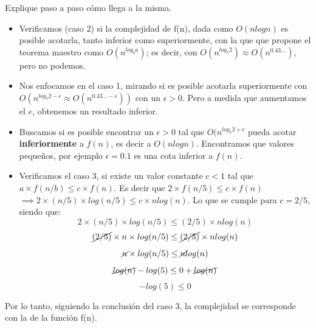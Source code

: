 \documentclass[titlepage,a4paper]{article}
\begin{document}
\begin{tcolorbox}[colback=blue!5!white,colframe=blue!75!black,title=Enunciado 2.3]
    Explique paso a paso cómo llega a la misma.
\end{tcolorbox}
\begin{itemize}
    \item Verificamos (caso 2) si la complejidad de f(n), dada como $O(n log n)$ es posible acotarla, tanto inferior como
    superiormente, con la que que propone el teorema maestro como $O(n^{log_b a})$; es decir, con
    $O(n^{log_5 2}) \approx O(n^{0.43...})$, pero no podemos.
    \item Nos enfocamos en el caso 1, mirando si es posible acotarla superiormente con
    $O(n^{log_5 2 - \epsilon}  \approx O(n^{0.43... - \epsilon}))$
    con un $\epsilon>0$. Pero a medida que aumentamos el $e$, obtenemos un resultado inferior.
    \item Buscamos si es posible encontrar un $\epsilon > 0$ tal que $O(n^{log_5 2 + \epsilon}$ pueda acotar
    \textbf{inferiormente} a $f(n)$, es decir a $O(n log n)$. Encontramos que valores pequeños, por ejemplo
    $\epsilon = 0.1$ es una cota inferior a $f(n)$.
    \item Verificamos el caso 3, si existe un valor constante $c < 1$ tal que $a \times f(n/b) \leq c \times f(n)$.
    Es decir que $2 \times f(n/5) \leq c \times f(n)$
    $\implies 2 \times (n/5)\times log(n/5) \leq c \times n log(n)$.
    Lo que se cumple para $c=2/5$, siendo que:
    $$2 \times (n/5)\times log(n/5) \leq (2/5) \times n log(n)$$
    $$\cancel{(2/5)} \times n \times log(n/5) \leq \cancel{(2/5)} \times n log(n)$$
    $$\cancel{n} \times log(n/5) \leq \cancel{n} log(n)$$
    $$\cancel{log(n)}-log(5) \leq 0+\cancel{log(n)}$$
    $$-log(5) \leq 0$$
\end{itemize}

Por lo tanto, siguiendo la conclusión del caso 3, la complejidad se corresponde con la de
la función f(n).
\end{document}
